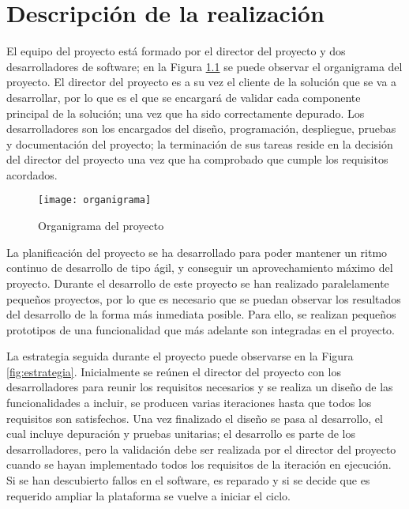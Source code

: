 \chapter{Descripción de la realización}
El equipo del proyecto está formado por el director del proyecto y dos
desarrolladores de software; en la Figura \ref{fig:organigrama} se puede
observar el organigrama del proyecto. El director del proyecto es a su vez el
cliente de la solución que se va a desarrollar, por lo que es el que se
encargará de validar cada componente principal de la solución; una vez que ha
sido correctamente depurado. Los desarrolladores son los encargados del diseño,
programación, despliegue, pruebas y documentación del proyecto; la terminación
de sus tareas reside en la decisión del director del proyecto una vez que ha
comprobado que cumple los requisitos acordados.

\begin{figure}[H]
	\begin{center}
		\texttt{[image: organigrama]}
		\caption{Organigrama del proyecto}
		\label{fig:organigrama}
	\end{center}
\end{figure}

La planificación del proyecto se ha desarrollado para poder mantener un ritmo
continuo de desarrollo de tipo ágil, y conseguir un aprovechamiento máximo del
proyecto. Durante el desarrollo de este proyecto se han realizado paralelamente
pequeños proyectos, por lo que es  necesario que se puedan observar los
resultados del desarrollo de la forma más inmediata posible. Para ello, se
realizan pequeños prototipos de una funcionalidad que más adelante son
integradas en el proyecto.

La estrategia seguida durante el proyecto puede observarse en la Figura
\ref{fig:estrategia}. Inicialmente se reúnen el director del proyecto con
los desarrolladores para reunir los requisitos necesarios y se realiza un
diseño de las funcionalidades a incluir, se producen varias iteraciones hasta
que todos los requisitos son satisfechos. Una vez finalizado el diseño se pasa
al desarrollo, el cual incluye depuración y pruebas unitarias; el desarrollo
es parte de los desarrolladores, pero la validación debe ser realizada por el
director del proyecto cuando se hayan implementado todos los requisitos de la
iteración en ejecución. Si se han descubierto fallos en el software, es
reparado y si se decide que es requerido ampliar la plataforma se vuelve a
iniciar el ciclo.

